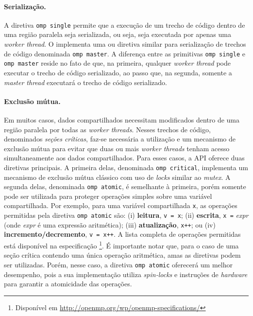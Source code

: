 \documentclass{SBCbookchapter}
\begin{document}
		\paragraph{Serialização.} A diretiva \texttt{omp single} permite que a execução de um trecho
		de código dentro de uma região paralela seja serializada, ou seja, seja executada por apenas
		uma \textit{worker thread}. O \openmp implementa uma ou diretiva similar para serialização
		de trechos de código denominada \texttt{omp master}. A diferença entre as primitivas \texttt{omp single}
		e \texttt{omp master} reside no fato de que, na primeira, qualquer \textit{worker thread} pode executar
		o trecho de código serializado, ao passo que, na segunda, somente a \textit{master thread} executará
		o trecho de código serializado.
		
		\paragraph{Exclusão mútua.} Em muitos casos, dados compartilhados necessitam modificados dentro
		de uma região paralela por todas as \textit{worker threads}. Nesses trechos de código, denominados
		\textit{seções críticas}, faz-se necessária a utilização e um mecanismo de exclusão mútua para evitar
		que duas ou mais \textit{worker threads} tenham acesso simultaneamente aos dados compartilhados.
		Para esses casos, a API \openmp oferece duas diretivas principais. A primeira delas, denominada
		\texttt{omp critical}, implementa um mecanismo de exclusão mútua clássico com uso de \textit{locks}
		similar ao \textit{mutex}. A segunda delas, denominada \texttt{omp atomic}, é semelhante à primeira, 
		porém somente pode ser utilizada para proteger operações simples sobre uma variável compartilhada.
		Por exemplo, para uma variável compartilhada \texttt{x}, as operações permitidas pela diretiva
		\texttt{omp atomic} são: (i) \textbf{leitura}, \eg \texttt{v = x}; (ii) \textbf{escrita}, \eg \texttt{x =} \textit{expr}
		(onde \textit{expr} é uma expressão aritmética); (iii) \textbf{atualização}, \eg \texttt{x++}; ou (iv) 
		\textbf{incremento/decremento}, \eg \texttt{v = x++}. A lista completa de operações permitidas está
		disponível na especificação \openmp\footnote{Disponível em \url{http://openmp.org/wp/openmp-specifications/}}.
		É importante notar que, para o caso de uma seção crítica contendo uma única operação aritmética,
		amas as diretivas podem ser utilizadas. Porém, nesse caso, a diretiva \texttt{omp atomic} oferecerá
		um melhor desempenho, pois a sua implementação utiliza \textit{spin-locks} e instruções de \textit{hardware}
		para garantir a atomicidade das operações.
		
\end{document}
